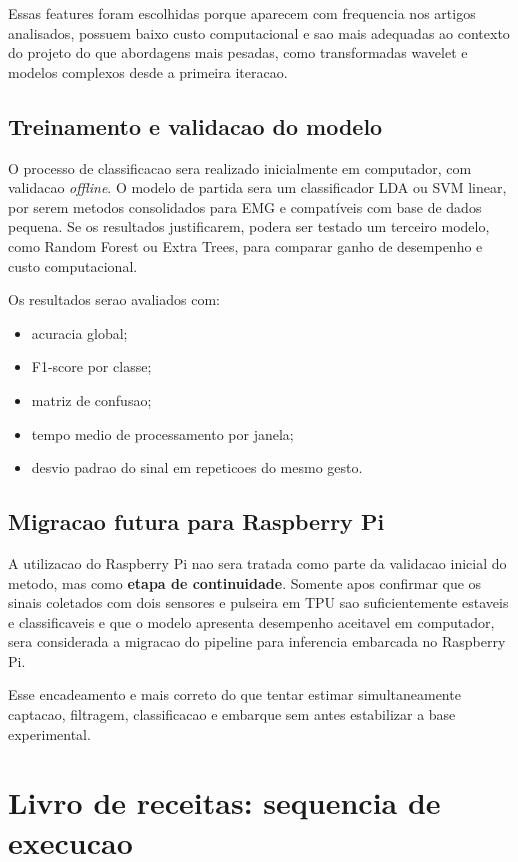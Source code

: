 \documentclass[12pt,oneside,a4paper,brazilian]{abntex2}
\begin{document}
Essas features foram escolhidas porque aparecem com frequencia nos artigos analisados, possuem baixo custo computacional e sao mais adequadas ao contexto do projeto do que abordagens mais pesadas, como transformadas wavelet e modelos complexos desde a primeira iteracao.

\subsection{Treinamento e validacao do modelo}

O processo de classificacao sera realizado inicialmente em computador, com validacao \textit{offline}. O modelo de partida sera um classificador LDA ou SVM linear, por serem metodos consolidados para EMG e compatíveis com base de dados pequena. Se os resultados justificarem, podera ser testado um terceiro modelo, como Random Forest ou Extra Trees, para comparar ganho de desempenho e custo computacional.

Os resultados serao avaliados com:

\begin{itemize}
  \item acuracia global;
  \item F1-score por classe;
  \item matriz de confusao;
  \item tempo medio de processamento por janela;
  \item desvio padrao do sinal em repeticoes do mesmo gesto.
\end{itemize}

\subsection{Migracao futura para Raspberry Pi}

A utilizacao do Raspberry Pi nao sera tratada como parte da validacao inicial do metodo, mas como \textbf{etapa de continuidade}. Somente apos confirmar que os sinais coletados com dois sensores e pulseira em TPU sao suficientemente estaveis e classificaveis e que o modelo apresenta desempenho aceitavel em computador, sera considerada a migracao do pipeline para inferencia embarcada no Raspberry Pi.

Esse encadeamento e mais correto do que tentar estimar simultaneamente captacao, filtragem, classificacao e embarque sem antes estabilizar a base experimental.

\section{Livro de receitas: sequencia de execucao}
\end{document}

